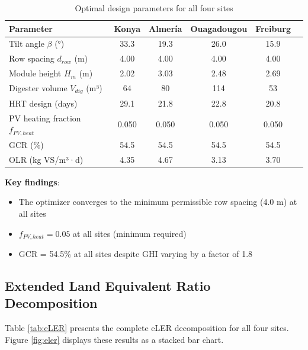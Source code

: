 \documentclass[12pt, a4paper]{article}
\begin{document}
\begin{table}[H]
\small
\caption{Optimal design parameters for all four sites}
\centering
\begin{tabular}{lccccc}
\toprule
\textbf{Parameter} & \textbf{Konya} & \textbf{Almería} & \textbf{Ouagadougou} & \textbf{Freiburg} \\
\midrule
Tilt angle $\beta$ (°) & 33.3 & 19.3 & 26.0 & 15.9 \\
Row spacing $d_{row}$ (m) & 4.00 & 4.00 & 4.00 & 4.00 \\
Module height $H_m$ (m) & 2.02 & 3.03 & 2.48 & 2.69 \\
Digester volume $V_{dig}$ (m³) & 64 & 80 & 114 & 53 \\
HRT design (days) & 29.1 & 21.8 & 22.8 & 20.8 \\
PV heating fraction $f_{PV,heat}$ & 0.050 & 0.050 & 0.050 & 0.050 \\
GCR (\%) & 54.5 & 54.5 & 54.5 & 54.5 \\
OLR (kg VS/m³·d) & 4.35 & 4.67 & 3.13 & 3.70 \\
\bottomrule
\end{tabular}
\label{tab:optimal}
\end{table}

\textbf{Key findings}:
\begin{itemize}[leftmargin=*]
    \item The optimizer converges to the minimum permissible row spacing (4.0 m) at all sites
    \item $f_{PV,heat} = 0.05$ at all sites (minimum required)
    \item GCR = 54.5\% at all sites despite GHI varying by a factor of 1.8
\end{itemize}

\subsection{Extended Land Equivalent Ratio Decomposition}

Table \ref{tab:eLER} presents the complete eLER decomposition for all four sites. Figure \ref{fig:eler} displays these results as a stacked bar chart.
\end{document}
